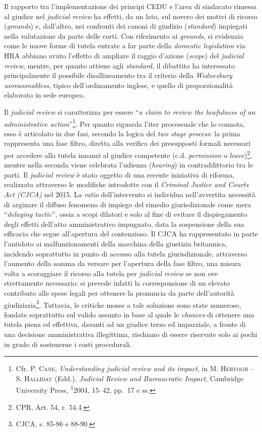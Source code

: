 \documentclass[12pt,it,a4paper,]{report}
\begin{document}
Il rapporto tra l'implementazione dei principi CEDU e l'area di
sindacato rimessa al giudice nel \emph{judicial review} ha effetti, da
un lato, sul novero dei motivi di ricorso (\emph{grounds}) e,
dall'altro, nei confronti dei canoni di giudizio (\emph{standard})
impiegati nella valutazione da parte delle corti. Con riferimento ai
\emph{grounds}, si evidenzia come le nuove forme di tutela entrate a far
parte della \emph{domestic legislation} via HRA abbiano avuto l'effetto
di ampliare il raggio d'azione (\emph{scope}) del \emph{judicial
review}, mentre, per quanto attiene agli \emph{standard}, il dibattito
ha interessato principalmente il possibile disallineamento tra il
criterio della \emph{Wednesbury unreasonabless}, tipico dell'ordinamento
inglese, e quello di proporzionalità elaborato in sede europea.

Il \emph{judicial review} si caratterizza per essere ``\emph{a claim to
review the lawfulness of an administrative action}''\footnote{Cfr. P.
  \textsc{Cane}, \emph{Understanding judicial review and its impact}, in
  M. \textsc{Hertogh} -- S. \textsc{Halliday} (Edd.), \emph{Judicial
  Review and Bureaucratic Impact}, Cambridge University Press,
  \textsuperscript{1}2004, 15--42, pp.~17 e ss.}. Per quanto riguarda
l'iter processuale che lo connota, esso è articolato in due fasi,
secondo la logica del \emph{two stage process}: la prima rappresenta una
fase filtro, diretta alla verifica dei presupposti formali necessari per
accedere alla tutela innanzi al giudice competente (c.d.
\emph{permission} o \emph{leave})\footnote{CPR, Art. 54, r. 54.4.},
mentre nella seconda viene celebrata l'udienza (\emph{hearing}) in
contraddittorio tra le parti. Il \emph{judicial review} è stato oggetto
di una recente iniziativa di riforma, realizzata attraverso le modifiche
introdotte con il \emph{Criminal Justice and Courts Act (CJCA)} nel
2015. La \emph{ratio} dell'intervento si individua nell'avvertita
necessità di arginare il diffuso fenomeno di impiego del rimedio
giurisdizionale come mera ``\emph{delaying tactic}'', ossia a scopi
dilatori e solo al fine di evitare il dispiegamento degli effetti
dell'atto amministrativo impugnato, data la sospensione della sua
efficacia che segue all'apertura del contenzioso. Il CJCA ha
rappresentato in parte l'antidoto ai malfunzionamenti della macchina
della giustizia britannica, incidendo soprattutto in punto di accesso
alla tutela giurisdizionale, attraverso l'aumento della somma da versare
per l'apertura della fase filtro, una misura volta a scoraggiare il
ricorso alla tutela per \emph{judicial review} se non ove strettamente
necessario: si prevede infatti la corresponsione di un elevato
contributo alle spese legali per ottenere la pronuncia da parte
dell'autorità giudiziaria\footnote{CJCA, s. 85-86 e 88-90.}. Tuttavia,
le critiche mosse a tale soluzione sono state numerose, fondate
soprattutto sul valido assunto in base al quale le \emph{chances} di
ottenere una tutela piena ed effettiva, davanti ad un giudice terzo ed
imparziale, a fronte di una decisione amministrativa illegittima,
rischiano di essere riservate solo ai pochi in grado di sostenerne i
costi procedurali.
\end{document}
